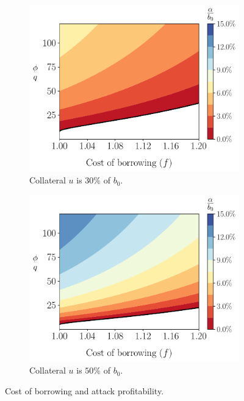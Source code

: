 \begin{figure}[htb]
  \centering
  \begin{subfigure}{0.49\textwidth}
    \includegraphics[width=\textwidth]{./plots/plotf30.pdf}
    \caption{Collateral $u$ is $30\%$ of $b_0$.}
    \label{fig:plotf30}
  \end{subfigure}
  \hfill
  \begin{subfigure}{0.49\textwidth}
    \includegraphics[width=\textwidth]{./plots/plotf50.pdf}
    \caption{Collateral $u$ is $50\%$ of $b_0$.}
    \label{fig:plotf50}
  \end{subfigure}
  \caption{Cost of borrowing and attack profitability.}
  \label{fig:plotf}
\end{figure}


